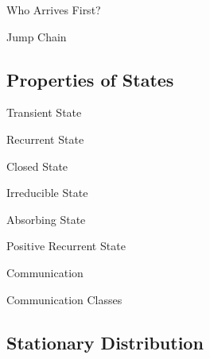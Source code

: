 \documentclass[11pt,a4paper]{article}
\begin{document}
\begin{remark}{Who Arrives First?}

\end{remark}

\begin{definition}{Jump Chain}

\end{definition}

\subsection{Properties of States}

\begin{definition}{Transient State}
\end{definition}

\begin{definition}{Recurrent State}
\end{definition}

\begin{definition}{Closed State}

\end{definition}

\begin{definition}{Irreducible State}

\end{definition}

\begin{definition}{Absorbing State}

\end{definition}

\begin{definition}{Positive Recurrent State}

\end{definition}

\begin{definition}{Communication}
\end{definition}

\begin{definition}{Communication Classes}
\end{definition}

\subsection{Stationary Distribution}
\end{document}
